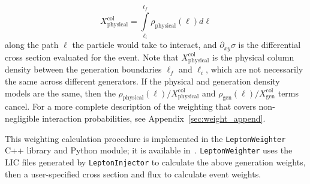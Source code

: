 \documentclass[main.tex]{subfiles}
\newcommand{\LeptonInjector}{\texttt{LeptonInjector}}
\newcommand{\LeptonWeighter}{\texttt{LeptonWeighter}}
\begin{document}
\begin{equation}
X_\textrm{physical}^\textrm{col} = \int\limits_{\ell_{i}}^{\ell_{f}}\rho_\textrm{physical}(\ell) d\ell
\end{equation}
along the path $\ell$ the particle would take to interact, and $\partial_{xy}\sigma$ is the differential cross section evaluated for the event.
Note that $X_\textrm{physical}^\textrm{col}$ is the physical column density between the generation boundaries $\ell_f$ and $\ell_i$, which are not necessarily the same across different generators.
If the physical and generation density models are the same, then the ${\rho_\textrm{physical}(\ell)}/{X_\textrm{physical}^\textrm{col}}$ and ${\rho_\textrm{gen}(\ell)}/{X_\textrm{gen}^\textrm{col}}$ terms cancel.
For a more complete description of the weighting that covers non-negligible interaction probabilities, see Appendix~\ref{sec:weight_append}.


This weighting calculation procedure is implemented in the \LeptonWeighter{} {\ttf C++} library and Python module; it is available in~\cite{LeptonWeighterRepository}.
\LeptonWeighter{} uses the LIC files generated by \LeptonInjector{} to calculate the above generation weights, then a user-specified cross section and flux to calculate event weights.
\end{document}
